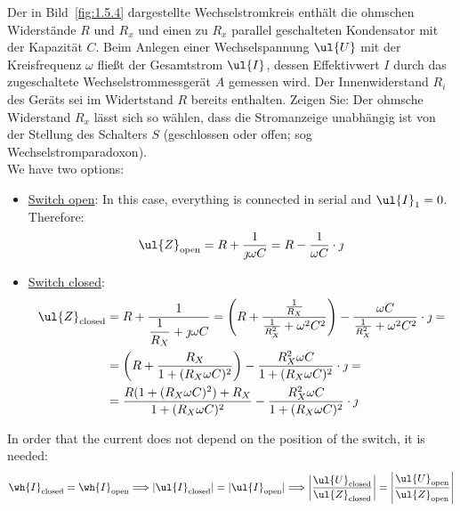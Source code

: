 \begin{ejercicio}[Wechselstromparadoxon]
    Der in Bild~\ref{fig:1.5.4} dargestellte Wechselstromkreis enthält die ohmschen Widerstände $R$ und $R_x$ und einen zu $R_x$ parallel geschalteten Kondensator mit der Kapazität $C$. Beim Anlegen einer Wechselspannung $\ul{U}$ mit der Kreisfrequenz $\omega$ fließt der Gesamtstrom $\ul{I}$, dessen Effektivwert $I$ durch das zugeschaltete Wechselstrommessgerät $A$ gemessen wird. Der Innenwiderstand $R_i$ des Geräts sei im Widertstand $R$ bereits enthalten. Zeigen Sie: Der ohmsche Widerstand $R_x$ lässt sich so wählen, dass die Stromanzeige unabhängig ist von der Stellung des Schalters $S$ (geschlossen oder offen; sog Wechselstromparadoxon).\\

    We have two options:
    \begin{itemize}
        \item \ul{Switch open}: In this case, everything is connected in serial and $\ul{I}_1=0$. Therefore:
        \begin{align*}
            \ul{Z}_{\text{open}} = R + \dfrac{1}{\jmath \omega C} = R -\frac{1}{\omega C}\cdot \jmath
        \end{align*}

        \item \ul{Switch closed}:
        \begin{align*}
            \ul{Z}_{\text{closed}} &= R + \dfrac{1}{\dfrac{1}{R_X} + \jmath\omega C}
            = \left(R + \dfrac{\frac{1}{R_X}}{\frac{1}{R_X^2} + \omega^2C^2}\right) - \dfrac{\omega C}{\frac{1}{R_X^2} + \omega^2C^2}\cdot \jmath
            =\\&= \left(R + \dfrac{R_X}{1 + (R_X\omega C)^2}\right) - \dfrac{R_X^2\omega C}{1 + (R_X\omega C)^2}\cdot \jmath
            =\\&= \dfrac{R(1 + (R_X\omega C)^2) + R_X}{1 + (R_X\omega C)^2}- \dfrac{R_X^2\omega C}{1 + (R_X\omega C)^2}\cdot \jmath
        \end{align*}
    \end{itemize}

    In order that the current does not depend on the position of the switch, it is needed:
    \begin{align*}
        \wh{I}_{\text{closed}} = \wh{I}_{\text{open}}
        \Longrightarrow
        |\ul{I}_{\text{closed}}| = |\ul{I}_{\text{open}}|
        \Longrightarrow
        \left|\dfrac{\ul{U}_{\text{closed}}}{\ul{Z}_{\text{closed}}}\right|
        = \left|\dfrac{\ul{U}_{\text{open}}}{\ul{Z}_{\text{open}}}\right|
    \end{align*}


\end{ejercicio}
